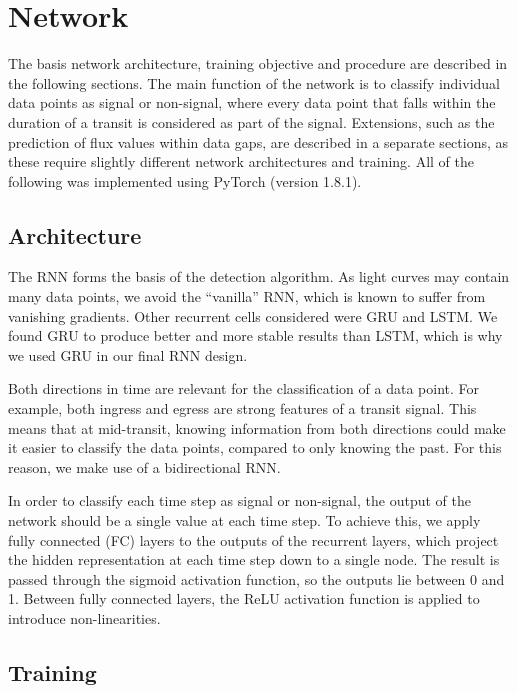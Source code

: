 
\section{Network}
\label{sec:network}

The basis network architecture, training objective and procedure are described in the following sections. The main function of the network is to classify individual data points as signal or non-signal, where every data point that falls within the duration of a transit is considered as part of the signal. Extensions, such as the prediction of flux values within data gaps, are described in a separate sections, as these require slightly different network architectures and training. All of the following was implemented using PyTorch (version 1.8.1).

\subsection{Architecture}
\label{sec:architecture}

The RNN forms the basis of the detection algorithm. As light curves may contain many data points, we avoid the ``vanilla'' RNN, which is known to suffer from vanishing gradients. Other recurrent cells considered were GRU and LSTM. We found GRU to produce better and more stable results than LSTM, which is why we used GRU in our final RNN design. 

Both directions in time are relevant for the classification of a data point. For example, both ingress and egress are strong features of a transit signal. This means that at mid-transit, knowing information from both directions could make it easier to classify the data points, compared to only knowing the past. For this reason, we make use of a bidirectional RNN.

In order to classify each time step as signal or non-signal, the output of the network should be a single value at each time step. To achieve this, we apply fully connected (FC) layers to the outputs of the recurrent layers, which project the hidden representation at each time step down to a single node. The result is passed through the sigmoid activation function, so the outputs lie between 0 and 1. Between fully connected layers, the ReLU activation function is applied to introduce non-linearities.


\subsection{Training}
\label{sec:training}

